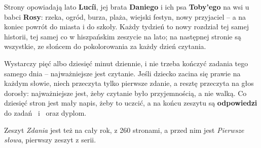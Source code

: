 Strony opowiadają lato \textbf{Lucíi}, jej brata \textbf{Daniego} i ich
psa \textbf{Toby'ego} na wsi u babci \textbf{Rosy}: rzeka, ogród, burza,
plaża, wiejski festyn, nowy przyjaciel -- a na koniec powrót do miasta i
do szkoły. Każdy tydzień to nowy rozdział tej samej historii, tej samej
co w hiszpańskim zeszycie na lato; na następnej stronie są wszystkie, ze
słońcem do pokolorowania za każdy dzień czytania.

Wystarczy pięć albo dziesięć minut dziennie, i nie trzeba kończyć
zadania tego samego dnia -- najważniejsze jest czytanie. Jeśli dziecko
zacina się prawie na każdym słowie, niech przeczyta tylko pierwsze
zdanie, a resztę przeczyta na głos dorosły: najważniejsze jest, żeby
czytanie było przyjemnością, a nie walką. Co dziesięć stron jest mały
napis, żeby to uczcić, a na końcu zeszytu są \textbf{odpowiedzi} do
zadań \lblAdivina\ i \lblRelaciona\ oraz dyplom.

{\small\color{colorGris} Zeszyt \emph{Zdania} jest też na cały rok, z
260 stronami, a przed nim jest \emph{Pierwsze słowa}, pierwszy zeszyt z
serii.\par}
\newpage

